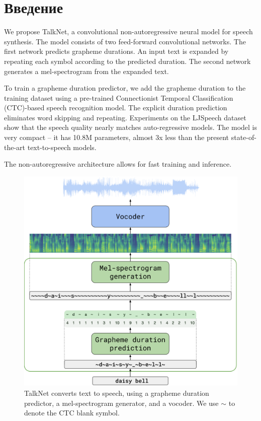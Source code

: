 \section*{Введение}

We propose TalkNet, a convolutional non-autoregressive neural model for speech syn\-thesis. The model consists of two feed-forward convolutional networks. The first network predicts grapheme durations. An input text is expanded by repeating each symbol accor\-ding to the predicted duration. The second network generates a mel-spectrogram from the expanded text.

To train a grapheme duration predictor, we add the grapheme duration to the training dataset using a pre-trained Connectionist Temporal Classification (CTC)-based speech recognition model. The explicit duration prediction eliminates word skipping and repeating. Experiments on the LJSpeech dataset show that the speech quality nearly matches auto-regressive models. The model is very compact -- it has 10.8M parameters, almost 3x less than the present state-of-the-art text-to-speech models.

The non-autoregressive architecture allows for fast training and inference.

\begin{figure}[!ht]
\centering
\includegraphics[width=1.0\textwidth]{images/arch.png}
\caption{TalkNet converts text to speech, using a grapheme duration predictor, a mel-spectrogram generator, and a vocoder. We use $\sim$ to denote the CTC blank symbol.}
\label{fig:arch}
\end{figure}